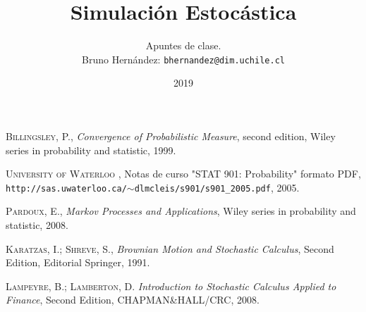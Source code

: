 \documentclass[a4paper]{article}
\title{Simulación Estocástica}
\author{Apuntes de clase.\\Bruno Hernández:  \texttt{bhernandez@dim.uchile.cl}}
\date{2019}
\numberwithin{equation}{subsection}
\begin{document}
\maketitle
\tableofcontents
\newpage

\newpage

\newpage

\newpage

\newpage

\newpage

\newpage

\newpage

\newpage

\newpage


\begin{thebibliography}{X}
 \textsc{Billingsley, P.},
\textit{Convergence of Probabilistic Measure}, second edition,
Wiley series in probability and statistic, 1999.

 \textsc{University of Waterloo} ,
Notas de curso "STAT 901: Probability" formato PDF,
\texttt{http://sas.uwaterloo.ca/$\sim$dlmcleis/s901/s901\_2005.pdf}, 2005.

 \textsc{Pardoux, E.}, \textit{Markov Processes and Applications},
Wiley series in probability and statistic, 2008.

 \textsc{Karatzas, I.};\textsc{ Shreve, S.}, \textit{Brownian Motion and Stochastic Calculus}, Second Edition, Editorial Springer, 1991.

 \textsc{Lampeyre, B.; Lamberton, D.} \textit{Introduction to Stochastic Calculus Applied to Finance}, Second Edition, CHAPMAN&HALL/CRC, 2008.
\end{thebibliography}
\end{document}
